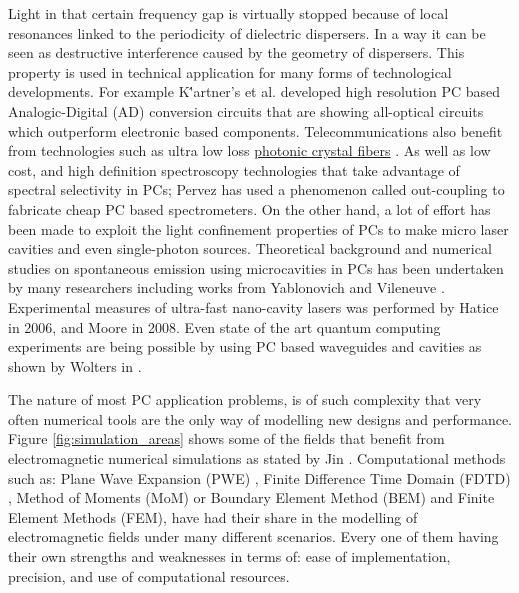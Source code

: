 Light in that certain frequency gap is virtually stopped because of local resonances linked to the periodicity of dielectric dispersers. In a way it can be seen as destructive interference caused by the geometry of dispersers. This property is used in technical application for many forms of technological developments. For example K\''artner's et al. developed high resolution PC based Analogic-Digital (AD) conversion circuits \cite{F.X.Kaertner2006} that are showing all-optical circuits which outperform electronic based components. Telecommunications also benefit from technologies such as ultra low loss \href{http://en.wikipedia.org/wiki/Photonic-crystal_fiber}{photonic crystal fibers} \cite{A.M.Apetrei2005}. As well as low cost, and high definition spectroscopy technologies that take advantage of spectral selectivity in PCs; Pervez \cite{Pervez2010} has used a phenomenon called out-coupling to fabricate cheap PC based spectrometers. On the other hand, a lot of effort has been made to exploit the light confinement properties of PCs to make micro laser cavities and even single-photon sources. Theoretical background and numerical studies on spontaneous emission using microcavities in PCs has been undertaken by many researchers including works from Yablonovich and Vileneuve \cite{Yablonovich1987,Yablonovich1991,Villeneuve1996}. Experimental measures of ultra-fast nano-cavity lasers was performed by Hatice \cite{Altug2006} in 2006, and Moore \cite{Moore2008} in 2008. Even state of the art quantum computing experiments are being possible by using PC based waveguides and cavities as shown by Wolters in \cite{Wolters2010}.

The nature of most PC application problems, is of such complexity that very often numerical tools are the only way of modelling new designs and performance. Figure \ref{fig:simulation_areas} shows some of the fields that benefit from electromagnetic numerical simulations as stated by Jin \cite{Jin2010}.  Computational methods such as: Plane Wave Expansion (PWE) \cite{StevenG.Johnson2001,Loaiza2011},  Finite Difference Time Domain (FDTD) \cite{A.M.Apetrei2005,Oskooi2009}, Method of Moments (MoM) or Boundary Element Method (BEM) and Finite Element Methods (FEM)\cite{Rodriguez2005,Masanori2001}, have had their share in the modelling of electromagnetic fields under many different scenarios. Every one of them having their own strengths and weaknesses in terms of: ease of implementation, precision, and use of computational resources.

